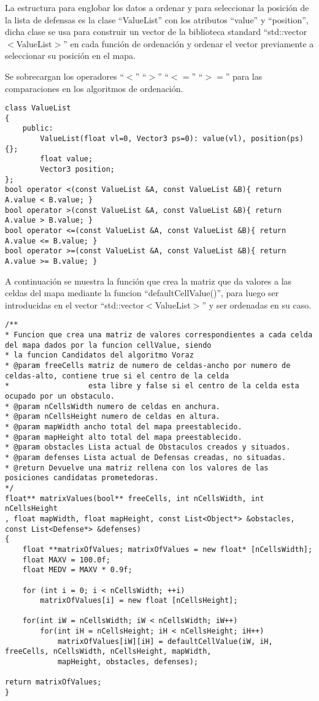 La estructura para englobar los datos a ordenar y para seleccionar la posición de la lista de defensas es la clase ``ValueList'' con los atributos ``value'' y ``position'', dicha clase se usa para construir un vector de la biblioteca standard ``std::vector$<$ValueList$>$'' en cada función de ordenación y ordenar el vector previamente a seleccionar su posición en el mapa.

Se sobrecargan los operadores ``$<$'' ``$>$'' ``$<=$'' ``$>=$'' para las comparaciones en los algoritmos de ordenación.

\begin{lstlisting}
class ValueList
{
	public:
		ValueList(float vl=0, Vector3 ps=0): value(vl), position(ps){};
		float value;
		Vector3 position;
};
bool operator <(const ValueList &A, const ValueList &B){ return A.value < B.value; }
bool operator >(const ValueList &A, const ValueList &B){ return A.value > B.value; }
bool operator <=(const ValueList &A, const ValueList &B){ return A.value <= B.value; }
bool operator >=(const ValueList &A, const ValueList &B){ return A.value >= B.value; }
\end{lstlisting}

A continuación se muestra la función que crea la matriz que da valores a las celdas del mapa mediante la funcion ``defaultCellValue()'', para luego ser introducidas en el vector ``std::vector$<$ValueList$>$'' y ser ordenadas en su caso.
\begin{lstlisting}
/**
* Funcion que crea una matriz de valores correspondientes a cada celda del mapa dados por la funcion cellValue, siendo
* la funcion Candidatos del algoritmo Voraz
* @param freeCells matriz de numero de celdas-ancho por numero de celdas-alto, contiene true si el centro de la celda
*                  esta libre y false si el centro de la celda esta ocupado por un obstaculo.
* @param nCellsWidth numero de celdas en anchura.
* @param nCellsHeight numero de celdas en altura.
* @param mapWidth ancho total del mapa preestablecido.
* @param mapHeight alto total del mapa preestablecido.
* @param obstacles Lista actual de Obstaculos creados y situados.
* @param defenses Lista actual de Defensas creadas, no situadas.
* @return Devuelve una matriz rellena con los valores de las posiciones candidatas prometedoras.
*/
float** matrixValues(bool** freeCells, int nCellsWidth, int nCellsHeight
, float mapWidth, float mapHeight, const List<Object*> &obstacles, const List<Defense*> &defenses)
{
	float **matrixOfValues; matrixOfValues = new float* [nCellsWidth];
	float MAXV = 100.0f;
	float MEDV = MAXV * 0.9f;

	for (int i = 0; i < nCellsWidth; ++i)
		matrixOfValues[i] = new float [nCellsHeight];

	for(int iW = nCellsWidth; iW < nCellsWidth; iW++)
		for(int iH = nCellsHeight; iH < nCellsHeight; iH++)
			matrixOfValues[iW][iH] = defaultCellValue(iW, iH, freeCells, nCellsWidth, nCellsHeight, mapWidth,
			mapHeight, obstacles, defenses);

return matrixOfValues;
}
\end{lstlisting}